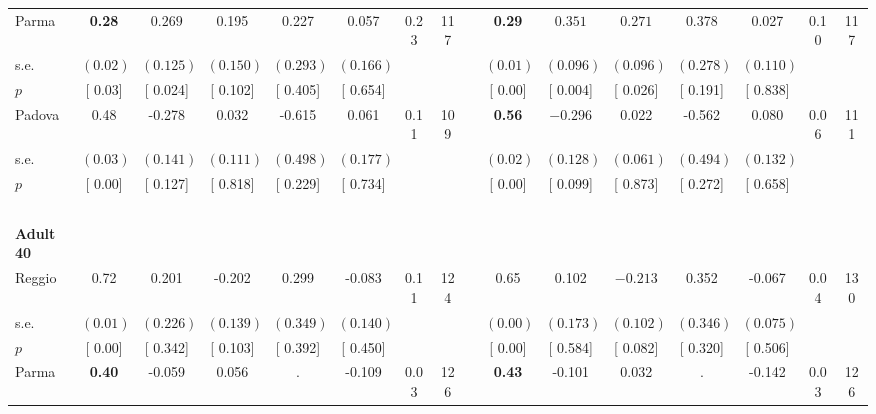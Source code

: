 \begin{longtable}{L{8em} c c c c c c c p{1em} c c c c c c c}
\quad \quad \quad Parma& \textbf{     0.28} & $ \mathbf{    0.269}$ &     0.195 &     0.227 &     0.057 &      0.23 &       117 & & \textbf{     0.29} & $ \mathbf{    0.351}$ & $ \mathbf{    0.271}$ &     0.378 &     0.027 &      0.10 &       117  \\*
\quad \quad \quad \quad s.e.& $ (     0.02)$ & $ (    0.125)$ & $ (    0.150)$ & $ (    0.293)$ & $ (    0.166)$ & & & & $ (     0.01)$ & $ (    0.096)$ & $ (    0.096)$ & $ (    0.278)$ & $ (    0.110)$ & &  \\*
\quad \quad \quad \quad $ p$ & [     0.03] & [    0.024] & [    0.102] & [    0.405] & [    0.654] & & & & [     0.00] & [    0.004] & [    0.026] & [    0.191] & [    0.838] & &  \\[1em]
\quad \quad \quad Padova& 0.48 &    -0.278 &     0.032 &    -0.615 &     0.061 &      0.11 &       109 & & \textbf{     0.56} & $ \mathbf{   -0.296}$ &     0.022 &    -0.562 &     0.080 &      0.06 &       111  \\*
\quad \quad \quad \quad s.e.& $ (     0.03)$ & $ (    0.141)$ & $ (    0.111)$ & $ (    0.498)$ & $ (    0.177)$ & & & & $ (     0.02)$ & $ (    0.128)$ & $ (    0.061)$ & $ (    0.494)$ & $ (    0.132)$ & &  \\*
\quad \quad \quad \quad $ p$ & [     0.00] & [    0.127] & [    0.818] & [    0.229] & [    0.734] & & & & [     0.00] & [    0.099] & [    0.873] & [    0.272] & [    0.658] & &  \\[1em]
~\\[1em]
\quad \quad \textbf{Adult 40} & & & & & & & & & & & & & & & \\* 
\quad \quad \quad Reggio& 0.72 &     0.201 &    -0.202 &     0.299 &    -0.083 &      0.11 &       124 & & 0.65 &     0.102 & $ \mathbf{   -0.213}$ &     0.352 &    -0.067 &      0.04 &       130  \\*
\quad \quad \quad \quad s.e.& $ (     0.01)$ & $ (    0.226)$ & $ (    0.139)$ & $ (    0.349)$ & $ (    0.140)$ & & & & $ (     0.00)$ & $ (    0.173)$ & $ (    0.102)$ & $ (    0.346)$ & $ (    0.075)$ & &  \\*
\quad \quad \quad \quad $ p$ & [     0.00] & [    0.342] & [    0.103] & [    0.392] & [    0.450] & & & & [     0.00] & [    0.584] & [    0.082] & [    0.320] & [    0.506] & &  \\[1em]
\quad \quad \quad Parma& \textbf{     0.40} &    -0.059 &     0.056 &         . &    -0.109 &      0.03 &       126 & & \textbf{     0.43} &    -0.101 &     0.032 &         . &    -0.142 &      0.03 &       126  \\*

\end{longtable}
